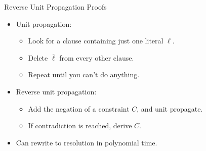 \documentclass{beamer}
\begin{document}
\begin{frame}{Reverse Unit Propagation Proofs}
    \begin{itemize}
        \item Unit propagation:
            \begin{itemize}
                \item Look for a clause containing just one literal $\ell$.
                \item Delete $\overline{\ell}$ from every other clause.
                \item Repeat until you can't do anything.
            \end{itemize}
        \item Reverse unit propagation:
            \begin{itemize}
                \item Add the negation of a constraint $C$, and unit propagate.
                \item If contradiction is reached, derive $C$.
            \end{itemize}
        \item Can rewrite to resolution in polynomial time.
    \end{itemize}
\end{frame}
\end{document}
